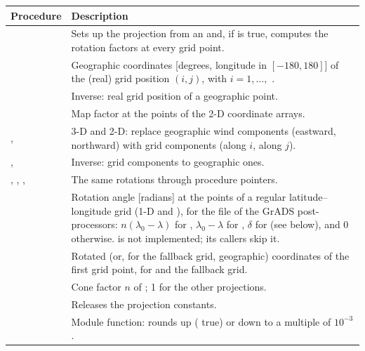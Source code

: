 \begin{longtable}{L{5cm} L{9cm}}
  \toprule
  \textbf{Procedure} & \textbf{Description} \\
  \midrule
  \endhead
  \bottomrule
  \endfoot
   &
    Sets up the projection from an  and, if
     is true, computes the rotation factors at every grid
    point. \\
   &
    Geographic coordinates [degrees, longitude in $[-180, 180]$] of the
    (real) grid position $(i, j)$, with $i = 1, \ldots,$ . \\
   &
    Inverse: real grid position of a geographic point. \\
   &
    Map factor at the points of the 2-D coordinate arrays. \\
  ,  &
    3-D and 2-D: replace geographic wind components (eastward,
    northward) with grid components (along $i$, along $j$). \\
  ,  &
    Inverse: grid components to geographic ones. \\
  , , ,
   &
    The same rotations through procedure pointers. \\
   &
    Rotation angle [radians] at the points of a regular latitude--longitude
    grid (1-D  and ), for the  file of the
    GrADS post-processors: $n(\lambda_0 - \lambda)$ for ,
    $\lambda_0 - \lambda$ for , $\delta$ for 
    (see below), and 0 otherwise.  is not implemented; its
    callers skip it. \\
   &
    Rotated (or, for the fallback grid, geographic) coordinates of the
    first grid point, for  and the fallback grid. \\
   &
    Cone factor $n$ of ; 1 for the other projections. \\
   &
    Releases the projection constants. \\
   &
    Module function: rounds  up ( true) or down to a
    multiple of $10^{-3}$. \\
\end{longtable}

